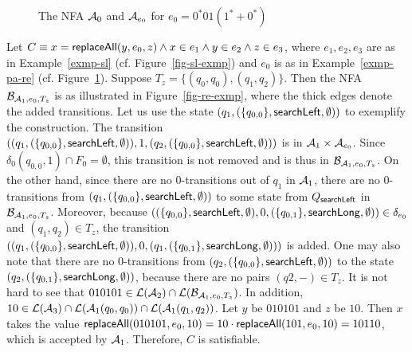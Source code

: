 \begin{example}
\begin{figure}[htbp]
\begin{center}
		\end{center}
		\caption{The NFA $\mathcal{A}_0$ and $\mathcal{A}_{e_0}$ for $e_0 = 0^*0 1(1^* + 0^*)$}\label{fig-pa-re}
	\end{figure} 
\end{example}

\begin{example}
	Let $C \equiv x = \mathsf{replaceAll}(y, e_0, z) \wedge x \in e_1 \wedge y \in e_2 \wedge z \in e_3$, where $e_1,e_2,e_3$ are as in Example~\ref{exmp-sl} (cf. Figure~\ref{fig-sl-exmp}) and $e_0$ is as in Example~\ref{exmp-pa-re} (cf. Figure~\ref{fig-pa-re}). Suppose $T_z = \{(q_0, q_0), (q_1, q_2)\}$. Then the NFA $\mathcal{B}_{\mathcal{A}_1, e_0, T_z}$ is as illustrated in Figure~\ref{fig-re-exmp}, where the thick edges denote the added transitions. Let us use the state $(q_1, (\{q_{0,0}\}, \mathsf{searchLeft}, \emptyset))$ to exemplify the construction. The transition $((q_1, (\{q_{0,0}\}, \mathsf{searchLeft}, \emptyset)), 1, (q_2, (\{q_{0,0}\}, \mathsf{searchLeft}, \emptyset)))$ is  in $\mathcal{A}_1 \times \mathcal{A}_{e_0}$. Since $\delta_0(q_{0,0}, 1) \cap F_0 = \emptyset$, this transition is not removed and is thus in $\mathcal{B}_{\mathcal{A}_1, e_0, T_z}$. On the other hand, since there are no $0$-transitions out of $q_1$ in $\mathcal{A}_1$, there are no $0$-transitions from $(q_1, (\{q_{0,0}\}, \mathsf{searchLeft}, \emptyset))$ to some state from $Q_{\mathsf{searchLeft}}$ in $\mathcal{B}_{\mathcal{A}_1, e_0, T_z}$. 
	Moreover, because $((\{q_{0,0}\}, \mathsf{searchLeft}, \emptyset), 0, (\{q_{0,1}\}, \mathsf{searchLong}, \emptyset)) \in \delta_{e_0}$ and $(q_1, q_2) \in T_z$, the transition $((q_1, (\{q_{0,0}\}, \mathsf{searchLeft}, \emptyset)), 0, (q_1, (\{q_{0,1}\}, \mathsf{searchLong}, \emptyset)))$ is added. 
	One may also note that there are no 0-transitions from $(q_2, (\{q_{0,0}\}, \mathsf{searchLeft}, \emptyset))$ to the state $(q_2, (\{q_{0,1}\}, \mathsf{searchLong}, \emptyset))$, because there are no pairs $(q2,-) \in T_z$.
	It is not hard to see that $010101 \in \mathcal{L}(\mathcal{A}_2) \cap \mathcal{L}(\mathcal{B}_{\mathcal{A}_1, e_0, T_z})$. In addition, $10 \in \mathcal{L}(\mathcal{A}_3) \cap \mathcal{L}(\mathcal{A}_1(q_0,q_0)) \cap \mathcal{L}(\mathcal{A}_1(q_1,q_2))$. Let $y$ be $010101$ and $z$ be $10$. Then $x$ takes the value $\mathsf{replaceAll}(010101, e_0, 10)=10 \cdot \mathsf{replaceAll}(101, e_0, 10)=10110$, which is accepted by $\mathcal{A}_1$. Therefore, $C$ is satisfiable.
	\begin{figure}[htbp]
		\begin{center}

\end{center}
\end{figure}
\end{example}

